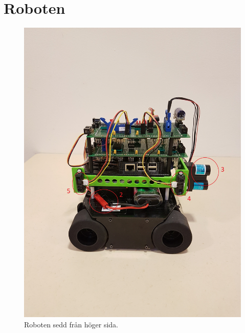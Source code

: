 \documentclass{article}
\begin{document}
\section{Roboten}
\begin{figure}[H]
\centering
\includegraphics[scale=0.1]{robot_right_side}
\caption{Roboten sedd från höger sida.}
\label{fig:robot_right_side}
\end{figure}

\clearpage
\end{document}
